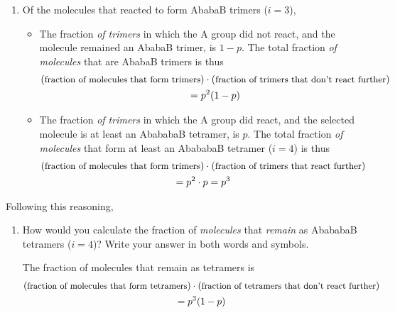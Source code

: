 \begin{activity}
\begin{model}
\begin{enumerate}
\item Of the molecules that reacted to form AbabaB trimers ($i=3$),
\begin{itemize}
	\item The fraction \emph{of trimers} in which the A group did not react, and the molecule remained an AbabaB trimer, is $1-p$. The total fraction \emph{of molecules} that are AbabaB trimers is thus 
	\begin{gather*}(\text{\small fraction of molecules that form trimers})\cdot(\text{\small fraction of trimers that don't react further})\\ =p^2(1-p)\end{gather*}

	\item The fraction \emph{of trimers} in which the A group did react, and the selected molecule is at least an AbababaB tetramer, is $p$. The total fraction \emph{of molecules} that form at least an AbababaB tetramer ($i=4$) is thus 
	\begin{gather*}(\text{\small fraction of molecules that form trimers})\cdot(\small \text{fraction of trimers that react further}) \\= p^2\cdot p=p^3 \end{gather*}
\end{itemize}

\end{enumerate}


\end{model}

\vspace{0.05in}
\begin{ctqs}

	\question Following this reasoning, 
	
		\begin{enumerate}
			\item How would you calculate the fraction of \emph{molecules} that \emph{remain} as AbababaB tetramers ($i=4$)?  Write your answer in both words and symbols.
	
				\begin{solution}[1.25in]
					The fraction of molecules that remain as tetramers is
	\begin{gather*}(\text{\small fraction of molecules that form tetramers})\cdot(\text{\small fraction of tetramers that don't react further})\\ =p^3(1-p)\end{gather*}
				\end{solution}
			

\end{enumerate}
\end{ctqs}
\end{activity}
